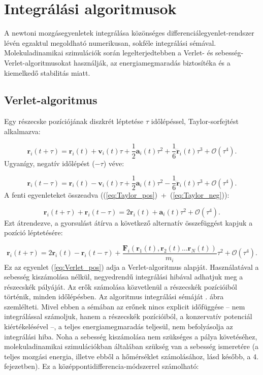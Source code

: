 \documentclass[12pt]{article}
\theoremstyle{plain}
\begin{document}
\section{Integrálási algoritmusok}

A newtoni mozgásegyenletek integrálása közönséges differenciálegyenlet-rendszer lévén egzaktul megoldható numerikusan, sokféle integrálási sémával. Molekuladinamikai szimulációk során legelterjedtebben a Verlet- és sebesség-Verlet-algoritmusokat használják, az energiamegmaradás biztosítéka és a kiemelkedő stabilitás miatt.


\subsection{Verlet-algoritmus}

Egy részecske pozíciójának diszkrét léptetése $\tau$ időlépéssel, Taylor-sorfejtést alkalmazva:

\begin{equation}
	\mathbf{r}_i (t+\tau) = \mathbf{r}_i(t) + \mathbf{v}_i(t) \tau + \frac{1}{2} \mathbf{a}_i(t) \tau^2 + \frac{1}{6} \dddot{\mathbf{r}}_i (t) \tau^3 + \mathcal{O}(\tau^4).
	\label{eq:Taylor_pos}
\end{equation}
Ugyanígy, negatív időlépést ($-\tau$) véve:

\begin{equation}
	\mathbf{r}_i (t-\tau) = \mathbf{r}_i(t) - \mathbf{v}_i(t) \tau + \frac{1}{2} \mathbf{a}_i(t) \tau^2 - \frac{1}{6} \dddot{\mathbf{r}}_i (t) \tau^3 + \mathcal{O}(\tau^4).
	\label{eq:Taylor_neg}
\end{equation}
A fenti egyenleteket összeadva ((\ref{eq:Taylor_pos})~+~(\ref{eq:Taylor_neg})):

\begin{equation}
	\mathbf{r}_i (t+\tau) + \mathbf{r}_i (t-\tau) = 2 \mathbf{r}_i(t) + \mathbf{a}_i(t) \tau^2 + \mathcal{O}(\tau^4).
\end{equation}
Ezt átrendezve, a gyorsulást átírva a következő alternatív összefüggést kapjuk a pozíció léptetésére:

\begin{equation}
	\mathbf{r}_i (t+\tau) = 2 \mathbf{r}_i(t) - \mathbf{r}_i (t-\tau) + \frac{\mathbf{F}_i(\mathbf{r}_1 (t), \mathbf{r}_2 (t) \dots \mathbf{r}_N (t))}{m_i} \tau^2 + \mathcal{O}(\tau^4).
	\label{eq:Verlet_pos}
\end{equation}
Ez az egyenlet (\ref{eq:Verlet_pos}) adja a Verlet-algoritmus alapját. Használatával a sebesség kiszámolása nélkül, negyedrendű integrálási hibával adhatjuk meg a részecskék pályáját. Az erők számolása közvetlenül a részecskék pozícióiból történik, minden időlépésben. Az algoritmus integrálási sémáját . ábra szemlélteti. Mivel ebben a sémában az erőnek nincs explicit időfüggése -- nem integrálással számoljuk, hanem a részecskék pozícióiból, a konzervatív potenciál kiértékelésével --, a teljes energiamegmaradás teljesül, nem befolyásolja az integrálási hiba. Noha a sebesség kiszámolása nem szükséges a pálya követéséhez, molekuladinamikai szimulációkban általában szükség van a sebesség ismeretére (a teljes mozgási energia, illetve ebből a hőmérséklet számolásához, lásd később, a 4. fejezetben). Ez a középpontidifferencia-módszerrel számolható:
\end{document}
